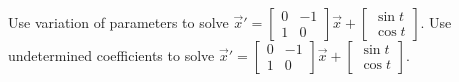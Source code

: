 \begin{exercise}
\ 
\begin{tasks}%
\task Use variation of parameters to solve $\vec{x}'=\begin{bmatrix} 0&-1 \\ 1& 0\end{bmatrix}\vec{x}+ \displaystyle \begin{bmatrix} \sin t \\ \cos t \end{bmatrix}$.
\task Use undetermined coefficients to solve $\vec{x}'=\begin{bmatrix} 0&-1 \\ 1& 0\end{bmatrix}\vec{x}+ \displaystyle \begin{bmatrix} \sin t \\ \cos t \end{bmatrix}$.
\end{tasks}
\end{exercise}